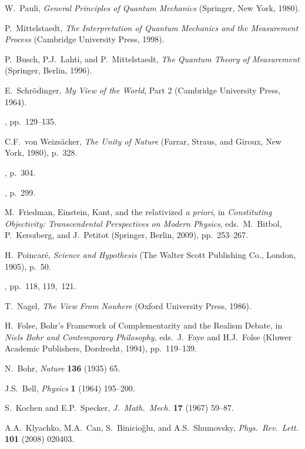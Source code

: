 \documentclass[12pt]{article}
\begin{document}
\begin{thebibliography}{99}
 W.\ Pauli, \textit{General Principles of Quantum Mechanics} (Springer, New York, 1980).

 P.\ Mittelstaedt, \textit{The Interpretation of Quantum Mechanics and the Measurement Process} (Cambridge University Press, 1998).

 P.\ Busch, P.J.\ Lahti, and P.\ Mittelstaedt, \textit{The Quantum Theory of Measurement} (Springer, Berlin, 1996).

  E.\ Schr\"odinger, \textit{My View of the World}, Part 2 (Cambridge University Press, 1964).

 \cite{SchrLifeMindMatter1}, pp.\ 129--135.

 C.F.\ von Weizs\"acker, \emph{The Unity of Nature} (Farrar, Straus, and Giroux, New York, 1980), p.~328.

 \cite{KantCPR1}, p.~304.

 \cite{KantCPR1}, p.~299.

 M.\ Friedman, Einstein, Kant, and the relativized \textit{a priori}, in \textit{Constituting Objectivity: Transcendental Perspectives on Modern Physics}, eds.\ M.\ Bitbol, P.\ Kerszberg,  and J.\ Petitot (Springer, Berlin, 2009), pp.\ 253--267.

 H.\ Poincar\'e, \textit{Science and Hypothesis} (The Walter Scott Publishing Co., London, 1905), p.~50.

 \cite{SchrLifeMindMatter1}, pp.\ 118, 119,~121.

 T.\ Nagel, \textit{The View From Nowhere} (Oxford University Press, 1986).

 H.\ Folse, Bohr's Framework of Complementarity and the Realism Debate, in \emph{Niels Bohr and Contemporary Philosophy}, eds.\ J.\ Faye and H.J.\ Folse (Kluwer Academic Publishers, Dordrecht, 1994), pp.\ 119--139.

 N.\ Bohr, \textit{Nature} \textbf{136} (1935) 65.

 J.S.\ Bell, \textit{Physics} \textbf{1} (1964) 195--200.

 S.\ Kochen and E.P.\ Specker, \textit{J.\ Math.\ Mech.} \textbf{17} (1967) 59--87.

 A.A.\ Klyachko, M.A.\ Can, S.\ Binicio\v glu, and A.S.\ Shumovsky, \textit{Phys.\ Rev.\ Lett.} \textbf{101} (2008) 020403.


\end{thebibliography}
\end{document}
